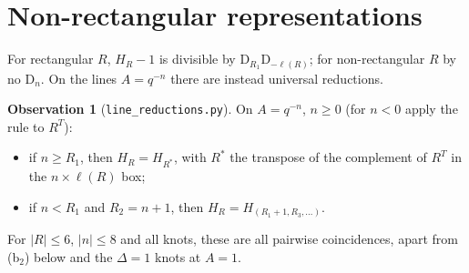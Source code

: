 \documentclass[11pt]{article}
\theoremstyle{definition}
\newtheorem{observation}[theorem]{Observation}
\theoremstyle{remark}
\newcommand{\D}{\mathrm{D}}
\begin{document}
\section{Non-rectangular representations}\label{sec:nonrect}

For rectangular $R$, $H_R-1$ is divisible by $\D_{R_1}\D_{-\ell(R)}$; for non-rectangular $R$ by no $\D_n$.  On the
lines $A=q^{-n}$ there are instead universal reductions.
\begin{observation}[\texttt{line\_reductions.py}]\label{obs:red}
On $A=q^{-n}$, $n\ge0$ (for $n<0$ apply the rule to $R^T$):
\begin{itemize}
\item[(a)] if $n\ge R_1$, then $H_R=H_{R^*}$, with $R^*$ the transpose of the complement of $R^T$ in the
$n\times\ell(R)$ box;
\item[(b)] if $n<R_1$ and $R_2=n+1$, then $H_R=H_{(R_1+1,R_3,\dots)}$.
\end{itemize}
For $|R|\le6$, $|n|\le8$ and all knots, these are all pairwise coincidences, apart from (b$_2$) below and the
$\Delta=1$ knots at $A=1$.
\end{observation}
\end{document}
